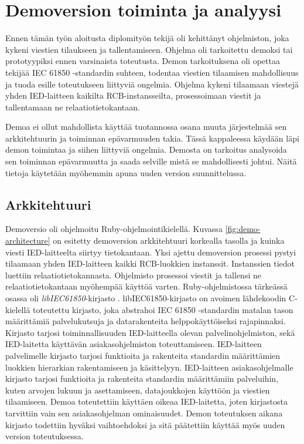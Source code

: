 \chapter{Demoversion toiminta ja analyysi}
\label{ch:projektin-lähtökohdat}
Ennen tämän työn aloitusta diplomityön tekijä oli kehittänyt ohjelmiston, joka kykeni viestien tilaukseen ja tallentamiseen. Ohjelma oli tarkoitettu demoksi tai prototyypiksi ennen varsinaista toteutusta. Demon tarkoituksena oli opettaa tekijää IEC 61850 -standardin suhteen, todentaa viestien tilaamisen mahdollisuus ja tuoda esille toteutukseen liittyviä ongelmia. Ohjelma kykeni tilaamaan viestejä yhden IED-laitteen kaikilta RCB-instansseilta, prosessoimaan viestit ja tallentamaan ne relaatiotietokantaan.

Demoa ei ollut mahdollista käyttää tuotannossa osana muuta järjestelmää sen arkkitehtuurin ja toiminnan epävarmuuden takia. Tässä kappaleessa käydään läpi demon toimintaa ja siihen liittyviä ongelmia. Demosta on tarkoitus analysoida sen toiminnan epävarmuutta ja saada selville mistä se mahdollisesti johtui. Näitä tietoja käytetään myöhemmin apuna uuden version suunnittelussa.


\section{Arkkitehtuuri}
\label{ch:demoversio-ja-sen-toiminta}
Demoversio oli ohjelmoitu Ruby-ohjelmointikielellä. Kuvassa \ref{fig:demo-architecture} on esitetty demoversion arkkitehtuuri korkealla tasolla ja kuinka viesti IED-laitteelta siirtyy tietokantaan. Yksi ajettu demoversion prosessi pystyi tilaamaan yhden IED-laitteen kaikki RCB-luok\-ki\-en instanssit. Instanssien tiedot luettiin relaatiotietokannasta. Ohjelmisto prosessoi viestit ja tallensi ne relaatiotietokantaan myöhempää käyttöä varten. Ruby-ohjelmistossa tärkeässä osassa oli \emph{libIEC61850}-kirjasto \cite{libIEC61850-homepage}. libIEC61850-kirjasto on avoimen lähdekoodin C-kielellä toteutettu kirjasto, joka abstrahoi IEC 61850 -standardin matalan tason määrittämiä palvelukutsuja ja datarakenteita helppokäyttöiseksi rajapinnaksi. Kirjasto tarjosi toiminnallisuuden IED-laitteella olevan palvelinohjelmiston, sekä IED-laitetta käyttävän asiakasohjelmiston toteuttamiseen. IED-laitteen palvelimelle kirjasto tarjosi funktioita ja rakenteita standardin määrittämien luokkien hierarkian rakentamiseen ja käsittelyyn. IED-laitteen asiakasohjelmalle kirjasto tarjosi funktioita ja rakenteita standardin määrittämiin palveluihin, kuten arvojen lukuun ja asettamiseen, datajoukkojen käyttöön ja viestien tilaamiseen. Demoa toteutettiin käyttäen oikeaa IED-laitetta, joten kirjastosta tarvittiin vain sen asiakasohjelman ominaisuudet. Demon toteutuksen aikana kirjasto todettiin hyväksi vaihtoehdoksi ja sitä päätettiin käyttää myös uuden version toteutuksessa.

